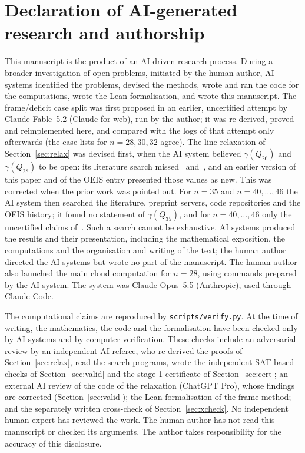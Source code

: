 \documentclass[11pt]{article}
\theoremstyle{definition}
\theoremstyle{remark}
\begin{document}
\section*{Declaration of AI-generated research and authorship}
This manuscript is the product of an AI-driven research process. During a broader investigation of
open problems, initiated by the human author, AI systems identified the problems, devised the methods,
wrote and ran the code for the computations, wrote the Lean formalisation, and wrote this manuscript. The
frame/deficit case split was first proposed in an earlier, uncertified attempt by Claude Fable~5.2
(Claude for web), run by the author; it was re-derived, proved and reimplemented here, and compared with
the logs of that attempt only afterwards (the case lists for $n=28,30,32$ agree). The line relaxation of Section~\ref{sec:relax} was devised first, when the AI system believed
$\gamma(Q_{26})$ and $\gamma(Q_{28})$ to be open: its literature search missed~\cite{HC}
and~\cite{Neuhaus}, and an earlier version of this paper and of the OEIS entry presented those values as
new. This was corrected when the prior work was pointed out. For $n=35$ and $n=40,\dots,46$ the AI system then
searched the literature, preprint servers, code repositories and the OEIS history; it found no statement
of $\gamma(Q_{35})$, and for $n=40,\dots,46$ only the uncertified claims of~\cite{Neuhaus}. Such a search
cannot be exhaustive. AI systems produced the results and their presentation, including
the mathematical exposition, the computations and the organisation and writing of the text; the human
author directed the AI systems but wrote no part of the manuscript. The human author also launched the
main cloud computation for $n=28$, using commands prepared by the AI system. The system was Claude
Opus~5.5 (Anthropic), used through Claude Code.

The computational claims are reproduced by \texttt{scripts/verify.py}. At the time of writing, the
mathematics, the code and the formalisation have been checked only by AI systems and by computer
verification. These checks include an adversarial review by an independent AI referee, who re-derived
the proofs of Section~\ref{sec:relax}, read the search programs, wrote the independent SAT-based checks of
Section~\ref{sec:valid} and the stage-1 certificate of Section~\ref{sec:cert}; an external AI review of the
code of the relaxation (ChatGPT Pro), whose findings are corrected (Section~\ref{sec:valid}); the Lean
formalisation of the frame method; and the separately written cross-check of Section~\ref{sec:xcheck}. No
independent human expert has reviewed the work. The human author has not read this manuscript or checked
its arguments. The author takes responsibility for the accuracy of this disclosure.
\end{document}

